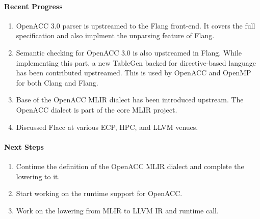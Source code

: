 \paragraph{Recent Progress}

\begin{enumerate}
\item OpenACC 3.0 parser is upstreamed to the Flang front-end. It covers the
      full specification and also implment the unparsing feature of Flang.
\item Semantic checking for OpenACC 3.0 is also upstreamed in Flang. While
      implementing this part, a new TableGen backed for directive-based language
      has been contributed upstreamed. This is used by OpenACC and OpenMP for
      both Clang and Flang.
\item Base of the OpenACC MLIR dialect has been introduced upstream. The OpenACC
      dialect is part of the core MLIR project.
\item Discussed Flacc at various ECP, HPC, and LLVM venues.
\end{enumerate}


\paragraph{Next Steps}

\begin{enumerate}
\item Continue the definition of the OpenACC MLIR dialect and complete the
      lowering to it.
\item Start working on the runtime support for OpenACC.
\item Work on the lowering from MLIR to LLVM IR and runtime call.
\end{enumerate}
